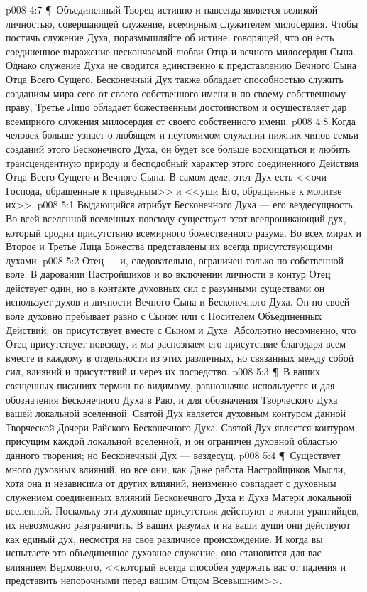 \vs p008 4:7 \P\ Объединенный Творец истинно и навсегда является великой личностью, совершающей служение, всемирным служителем милосердия. Чтобы постичь служение Духа, поразмышляйте об истине, говорящей, что он есть соединенное выражение нескончаемой любви Отца и вечного милосердия Сына. Однако служение Духа не сводится единственно к представлению Вечного Сына Отца Всего Сущего. Бесконечный Дух также обладает способностью служить созданиям мира сего от своего собственного имени и по своему собственному праву; Третье Лицо обладает божественным достоинством и осуществляет дар всемирного служения милосердия от своего собственного имени.
\vs p008 4:8 Когда человек больше узнает о любящем и неутомимом служении нижних чинов семьи созданий этого Бесконечного Духа, он будет все больше восхищаться и любить трансцендентную природу и бесподобный характер этого соединенного Действия Отца Всего Сущего и Вечного Сына. В самом деле, этот Дух есть <<очи Господа, обращенные к праведным>> и <<уши Его, обращенные к молитве их>>.
\vs p008 5:1 Выдающийся атрибут Бесконечного Духа --- его вездесущность. Во всей вселенной вселенных повсюду существует этот всепроникающий дух, который сродни присутствию всемирного божественного разума. Во всех мирах и Второе и Третье Лица Божества представлены их всегда присутствующими духами.
\vs p008 5:2 Отец ---  и, следовательно, ограничен только по собственной воле. В даровании Настройщиков и во включении личности в контур Отец действует один, но в контакте духовных сил с разумными существами он использует духов и личности Вечного Сына и Бесконечного Духа. Он по своей воле духовно пребывает равно с Сыном или с Носителем Объединенных Действий; он присутствует вместе с Сыном и  Духе. Абсолютно несомненно, что Отец присутствует повсюду, и мы распознаем его присутствие благодаря всем вместе и каждому в отдельности из этих различных, но связанных между собой сил, влияний и присутствий и через их посредство.
\vs p008 5:3 \P\ В ваших священных писаниях термин  по\hyp{}видимому, равнозначно используется и для обозначения Бесконечного Духа в Раю, и для обозначения Творческого Духа вашей локальной вселенной. Святой Дух является духовным контуром данной Творческой Дочери Райского Бесконечного Духа. Святой Дух является контуром, присущим каждой локальной вселенной, и он ограничен духовной областью данного творения; но Бесконечный Дух --- вездесущ.
\vs p008 5:4 \P\ Существует много духовных влияний, но все они, как  Даже работа Настройщиков Мысли, хотя она и независима от других влияний, неизменно совпадает с духовным служением соединенных влияний Бесконечного Духа и Духа Матери локальной вселенной. Поскольку эти духовные присутствия действуют в жизни урантийцев, их невозможно разграничить. В ваших разумах и на ваши души они действуют как единый дух, несмотря на свое различное происхождение. И когда вы испытаете это объединенное духовное служение, оно становится для вас влиянием Верховного, <<который всегда способен удержать вас от падения и представить непорочными перед вашим Отцом Всевышним>>.
